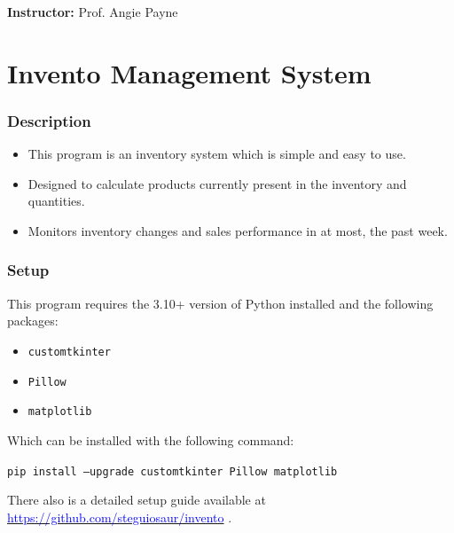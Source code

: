 \documentclass[12pt,a4paper]{article}
\begin{document}
    \noindent\textbf{Instructor:} Prof. Angie Payne

\newpage
\thispagestyle{plain}
\tableofcontents
\newpage
\setcounter{page}{1}
\part{ Invento Management System }

\section*{Description \hrulefill}
    \begin{itemize}
        \item This program is an inventory system which is simple and easy to use.
        \item Designed to calculate products currently present in the inventory and quantities.
        \item Monitors inventory changes and sales performance in at most, the past week.
    \end{itemize}
\hrulefill

\section*{Setup}

This program requires the 3.10+ version of Python installed and the following packages:

\begin{itemize}
    \item \texttt{customtkinter}
    \item \texttt{Pillow}
    \item \texttt{matplotlib}
\end{itemize}

\noindent Which can be installed with the following command:

\hfill{}

\texttt{pip install --upgrade customtkinter Pillow matplotlib}

\hfill{}

\noindent There also is a detailed setup guide available at \href{https://github.com/steguiosaur/invento}{\textcolor{blue}{https://github.com/steguiosaur/invento}} .
\end{document}
